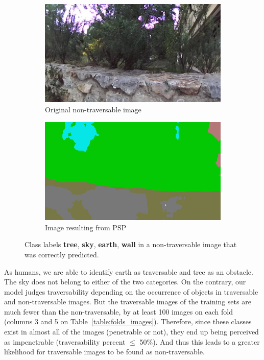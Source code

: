 \documentclass[12pt,a4paper,table,dvipsnames,tikz]{report}
\newcommand{\acronym}{\MakeUppercase}
\newcommand{\bl}[1]{{\hypersetup{linkcolor=blue}#1}}
\newcommand{\class}[1]{\textbf{\textcolor{#1}{#1}}} %
\begin{document}
	\begin{figure}[h!]
		\centering
		\begin{subfigure}[b]{0.45\textwidth}
			\includegraphics[width=\textwidth]{32-49_0000w}
			\caption{Original non-traversable image}
			\label{fig:obst:32-49:orig}
		\end{subfigure}
		\begin{subfigure}[b]{0.45\textwidth}
			\includegraphics[width=\textwidth]{32-49_0000w_psp}
			\caption{Image resulting from \acronym{psp}}
			\label{fig:obst:32-49:psp}
		\end{subfigure}
		\caption{Class labels \class{tree}, \class{sky}, \class{earth}, \class{wall} in 
			a non-traversable image that was correctly predicted.}
		\label{fig:obst:32-49}
	\end{figure}
	
	
	As humans, we are able to identify earth as traversable and tree as an obstacle. The 
	sky does not belong to either of the two categories. On the contrary, our model judges 
	traversability depending on the occurrence of objects in traversable and non-traversable 
	images. But the traversable images of the training sets are much fewer than the 
	non-traversable, by at least 100 images on each fold (columns 3 and 5 on
	Table~\bl{\ref{table:folds_images}}). 
	Therefore, since these classes exist in almost all of the images (penetrable or not), they 
	end up being perceived as impenetrable (traversability percent $\le$ 50\%).	And thus 
	this leads to a greater likelihood for traversable images to be found as non-traversable.
	\\
	
\end{document}
